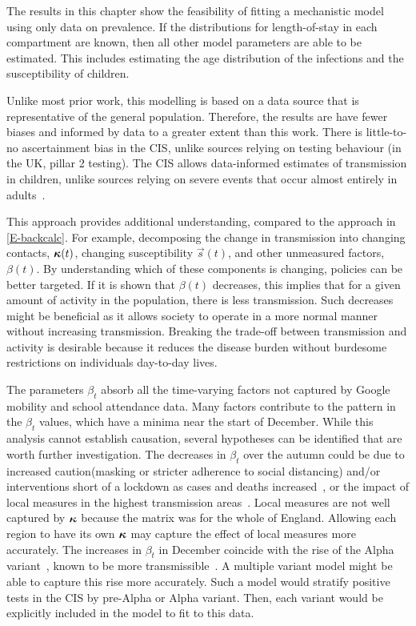 \documentclass[thesis.tex]{subfiles}
\begin{document}
The results in this chapter show the feasibility of fitting a mechanistic model using only data on prevalence.
If the distributions for length-of-stay in each compartment are known, then all other model parameters are able to be estimated.
This includes estimating the age distribution of the infections and the susceptibility of children.

Unlike most prior work, this modelling is based on a data source that is representative of the general population.
Therefore, the results are have fewer biases and informed by data to a greater extent than this work.
There is little-to-no ascertainment bias in the CIS, unlike sources relying on testing behaviour (in the UK, pillar 2 testing).
The CIS allows data-informed estimates of transmission in children, unlike sources relying on severe events that occur almost entirely in adults~\autocite{bhopalChildren}.

This approach provides additional understanding, compared to the approach in \cref{E-backcalc}.
For example, decomposing the change in transmission into changing contacts, $\bm{\kappa}(t)$, changing susceptibility $\vec{s}(t)$, and other unmeasured factors, $\beta(t)$.
By understanding which of these components is changing, policies can be better targeted.
If it is shown that $\beta(t)$ decreases, this implies that for a given amount of activity in the population, there is less transmission.
Such decreases might be beneficial as it allows society to operate in a more normal manner without increasing transmission.
Breaking the trade-off between transmission and activity is desirable because it reduces the disease burden without burdesome restrictions on individuals day-to-day lives.

The parameters $\beta_t$ absorb all the time-varying factors not captured by Google mobility and school attendance data.
Many factors contribute to the pattern in the $\beta_t$ values, which have a minima near the start of December.
While this analysis cannot establish causation, several hypotheses can be identified that are worth further investigation.
The decreases in $\beta_t$ over the autumn could be due to increased caution(\eg masking or stricter adherence to social distancing) and/or interventions short of a lockdown as cases and deaths increased~\autocite{jarvisEffect}, or the impact of local measures in the highest transmission areas~\autocite{scottCovid19}.
Local measures are not well captured by $\bm{\kappa}$ because the matrix was for the whole of England.
Allowing each region to have its own $\bm{\kappa}$ may capture the effect of local measures more accurately.
The increases in $\beta_t$ in December coincide with the rise of the Alpha variant~\autocite{lythgoeLineage}, known to be more transmissible~\autocite{daviesEstimated}.
A multiple variant model might be able to capture this rise more accurately.
Such a model would stratify positive tests in the CIS by pre-Alpha or Alpha variant.
Then, each variant would be explicitly included in the model to fit to this data.
\end{document}
